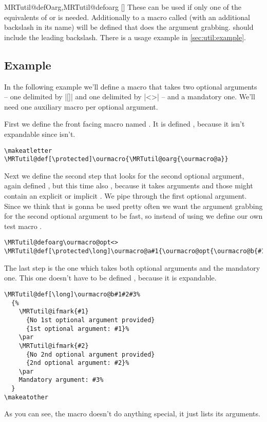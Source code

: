 \begin{describemacro}{MRTutil@defOarg,MRTutil@defoarg}
  []
  These can be used if only one of the equivalents of  or
   is needed. Additionally to  a macro called
   (with an additional backslash in its name) will be
  defined that does the argument grabbing.  should include the leading
  backslash. There is a usage example in \autoref{sec:util:example}.
\end{describemacro}

\subsection{Example}\label{sec:util:example}%
In the following example we'll define a macro that takes two optional arguments
-- one delimited by |[]| and one delimited by |<>| -- and a mandatory one. We'll
need one auxiliary macro per optional argument.

First we define the front facing macro named . It is defined
, because it isn't expandable since  isn't.
\begin{verbatim}
\makeatletter
\MRTutil@def[\protected]\ourmacro{\MRTutil@oarg{\ourmacro@a}}
\end{verbatim}
Next we define the second step that looks for the second optional argument,
again defined , but this time also , because it takes
arguments and those might contain an explicit or implicit . We pipe
through the first optional argument. Since we think that  is gonna
be used pretty often we want the argument grabbing for the second optional
argument to be fast, so instead of using  we define our own
test macro .
\begin{verbatim}
\MRTutil@defoarg\ourmacro@opt<>
\MRTutil@def[\protected\long]\ourmacro@a#1{\ourmacro@opt{\ourmacro@b{#1}}}
\end{verbatim}
The last step is the one which takes both optional arguments and the mandatory
one. This one doesn't have to be defined , because it is
expandable.
\begin{verbatim}
\MRTutil@def[\long]\ourmacro@b#1#2#3%
  {%
    \MRTutil@ifmark{#1}
      {No 1st optional argument provided}
      {1st optional argument: #1}%
    \par
    \MRTutil@ifmark{#2}
      {No 2nd optional argument provided}
      {2nd optional argument: #2}%
    \par
    Mandatory argument: #3%
  }
\makeatother
\end{verbatim}
As you can see, the macro doesn't do anything special, it just lists its
arguments.

